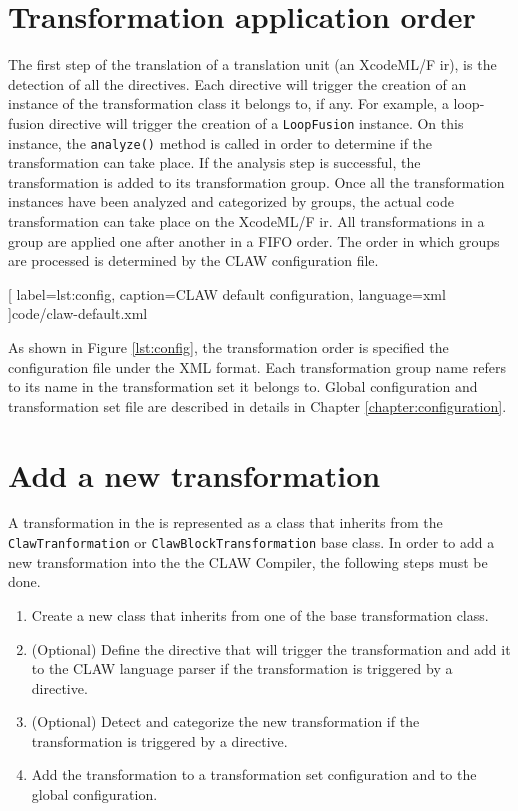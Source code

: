 \section{Transformation application order}
The first step of the translation of a translation unit (an XcodeML/F \gls{ir}),
is the detection of all the directives. Each directive will trigger the
creation of an instance of the transformation class it belongs to, if any. 
For example, a loop-fusion directive will trigger the creation of a 
\lstinline|LoopFusion| instance. On this instance, the \lstinline|analyze()| 
method is called in order to determine if the transformation can take place.
If the analysis step is successful, the transformation is added to its 
transformation group. Once all the transformation instances have been analyzed
and categorized by groups, the actual code transformation can take place on 
the XcodeML/F \gls{ir}. All transformations in a group are applied one after 
another in a FIFO order. The order in which groups are processed is determined 
by the CLAW configuration file.


  [
    label=lst:config,
    caption=CLAW default configuration,
    language=xml
  ]{code/claw-default.xml}

As shown in Figure \ref{lst:config}, the transformation order is specified the
configuration file under the XML format.
Each transformation group name refers to its name in the transformation set it
belongs to. Global configuration and transformation set file are described in
details in Chapter \ref{chapter:configuration}.

\section{Add a new transformation}
\label{section:new_trans}
A transformation in the \clawfc is represented as a class that inherits from
the \lstinline|ClawTranformation| or \lstinline|ClawBlockTransformation|
base class. In order to add a new transformation into the the CLAW Compiler,
the following steps must be done.

\begin{enumerate}
\item Create a new class that inherits from one of the base transformation
      class.
\item (Optional) Define the directive that will trigger the transformation 
      and add it to the CLAW language parser if the transformation is 
      triggered by a directive.
\item (Optional) Detect and categorize the new transformation if the 
      transformation is triggered by a directive.
\item Add the transformation to a transformation set configuration and to
      the global configuration.
\end{enumerate}

